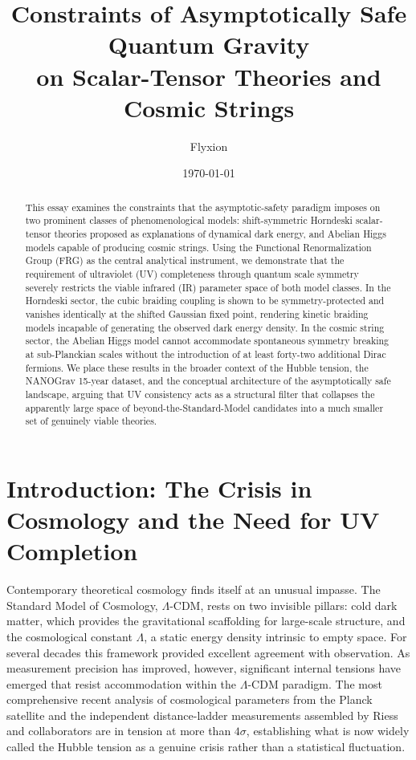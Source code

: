 \documentclass[12pt,a4paper]{article}
\title{\textbf{Constraints of Asymptotically Safe Quantum Gravity\\
on Scalar-Tensor Theories and Cosmic Strings}}
\author{Flyxion}
\date{\today}
\begin{document}
\maketitle

\begin{abstract}
\noindent
This essay examines the constraints that the asymptotic-safety paradigm
imposes on two prominent classes of phenomenological models: shift-symmetric
Horndeski scalar-tensor theories proposed as explanations of dynamical dark
energy, and Abelian Higgs models capable of producing cosmic strings. Using
the Functional Renormalization Group (FRG) as the central analytical
instrument, we demonstrate that the requirement of ultraviolet (UV)
completeness through quantum scale symmetry severely restricts the viable
infrared (IR) parameter space of both model classes. In the Horndeski sector,
the cubic braiding coupling is shown to be symmetry-protected and vanishes
identically at the shifted Gaussian fixed point, rendering kinetic braiding
models incapable of generating the observed dark energy density. In the cosmic
string sector, the Abelian Higgs model cannot accommodate spontaneous symmetry
breaking at sub-Planckian scales without the introduction of at least
forty-two additional Dirac fermions. We place these results in the broader
context of the Hubble tension, the NANOGrav 15-year dataset, and the
conceptual architecture of the asymptotically safe landscape, arguing that
UV consistency acts as a structural filter that collapses the apparently large
space of beyond-the-Standard-Model candidates into a much smaller set of
genuinely viable theories.
\end{abstract}

\newpage

\tableofcontents

\newpage

\section{Introduction: The Crisis in Cosmology and the Need for UV Completion}

Contemporary theoretical cosmology finds itself at an unusual impasse. The
Standard Model of Cosmology, $\Lambda$-CDM, rests on two invisible pillars:
cold dark matter, which provides the gravitational scaffolding for large-scale
structure, and the cosmological constant $\Lambda$, a static energy density
intrinsic to empty space. For several decades this framework provided
excellent agreement with observation. As measurement precision has improved,
however, significant internal tensions have emerged that resist accommodation
within the $\Lambda$-CDM paradigm. The most comprehensive recent analysis of
cosmological parameters from the Planck satellite \cite{Planck2018} and the
independent distance-ladder measurements assembled by Riess and collaborators
\cite{Riess2019} are in tension at more than $4\sigma$, establishing what is
now widely called the Hubble tension as a genuine crisis rather than a
statistical fluctuation.
\end{document}
